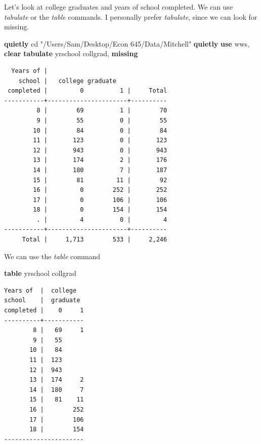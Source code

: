\documentclass[
]{book}
\newenvironment{Shaded}{\begin{snugshade}}{\end{snugshade}}
\newcommand{\FunctionTok}[1]{\textcolor[rgb]{0.13,0.29,0.53}{\textbf{#1}}}
\newcommand{\KeywordTok}[1]{\textcolor[rgb]{0.13,0.29,0.53}{\textbf{#1}}}
\newcommand{\NormalTok}[1]{#1}
\newcommand{\StringTok}[1]{\textcolor[rgb]{0.31,0.60,0.02}{#1}}
\begin{document}
Let's look at college graduates and years of school completed. We can use \emph{tabulate} or the \emph{table} commands. I personally prefer \emph{tabulate}, since we can look for missing.

\begin{Shaded}
\begin{Highlighting}[]
\KeywordTok{quietly}\NormalTok{ cd }\StringTok{"/Users/Sam/Desktop/Econ 645/Data/Mitchell"}
\KeywordTok{quietly} \KeywordTok{use}\NormalTok{ wws, }\KeywordTok{clear}
\KeywordTok{tabulate}\NormalTok{ yrschool collgrad, }\FunctionTok{missing}
\end{Highlighting}
\end{Shaded}

\begin{verbatim}
  Years of |
    school |   college graduate
 completed |         0          1 |     Total
-----------+----------------------+----------
         8 |        69          1 |        70 
         9 |        55          0 |        55 
        10 |        84          0 |        84 
        11 |       123          0 |       123 
        12 |       943          0 |       943 
        13 |       174          2 |       176 
        14 |       180          7 |       187 
        15 |        81         11 |        92 
        16 |         0        252 |       252 
        17 |         0        106 |       106 
        18 |         0        154 |       154 
         . |         4          0 |         4 
-----------+----------------------+----------
     Total |     1,713        533 |     2,246 
\end{verbatim}

We can use the \emph{table} command

\begin{Shaded}
\begin{Highlighting}[]
\KeywordTok{table}\NormalTok{ yrschool collgrad}
\end{Highlighting}
\end{Shaded}

\begin{verbatim}
Years of  |  college  
school    |  graduate 
completed |    0     1
----------+-----------
        8 |   69     1
        9 |   55      
       10 |   84      
       11 |  123      
       12 |  943      
       13 |  174     2
       14 |  180     7
       15 |   81    11
       16 |        252
       17 |        106
       18 |        154
----------------------
\end{verbatim}
\end{document}
